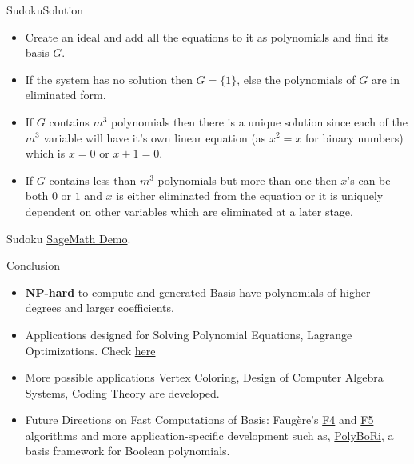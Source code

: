 \documentclass[aspectratio=169, handout, 10pt, hyperref=colorlinks]{beamer}
\begin{document}
\begin{frame}{Sudoku}{Solution}
\begin{itemize}
    \item Create an ideal and add all the equations to it as polynomials and find its \Grob basis $G$.

\item If the system has no solution then $G=\{1\}$, else the polynomials of $G$ are in eliminated form.
\item If $G$ contains $m^3$ polynomials then there is a unique solution since each of the $m^3$ variable will have it's own linear equation (as $x^2=x$ for binary numbers) which is $x=0$ or $x+1=0$.
\item If $G$ contains less than $m^3$ polynomials  but more than one then $x$'s can be both $0$ or $1$ and $x$ is either eliminated from the equation or it is uniquely dependent on other variables which are eliminated at a later stage.
\end{itemize}
\end{frame}
\begin{frame}{Sudoku}
\href{https://github.com/paramrathour/Groebner-Basis-Applications/blob/main/Sudoku Solver.ipynb}{SageMath Demo}.
\end{frame}
\begin{frame}{Conclusion}
\begin{itemize}
\item \textbf{NP-hard} to compute and generated \Grob Basis have polynomials of higher degrees and larger coefficients. 
\item Applications designed for Solving Polynomial Equations, Lagrange Optimizations. Check \href{https://github.com/paramrathour/Groebner-Basis-Applications}{here}
\item More possible applications Vertex Coloring, Design of Computer Algebra Systems, Coding Theory are developed.
\item Future Directions on Fast Computations of \Grob Basis: Faugère's \href{https://www-polsys.lip6.fr/~jcf/Papers/F99a.pdf}{F4} and \href{https://www-polsys.lip6.fr/~jcf/Papers/F02a.pdf}{F5} algorithms and more application-specific development such as, \href{https://www.sciencedirect.com/science/article/pii/S0747717109000273}{PolyBoRi}, a \Grob basis framework for Boolean polynomials.
\end{itemize}
\end{frame}
\appendix
\end{document}
